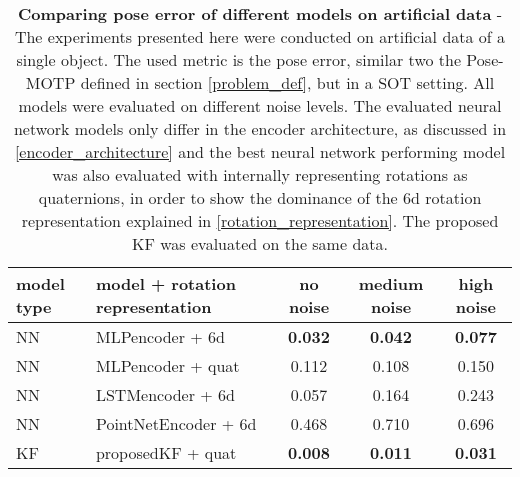 \documentclass{article}
\begin{document}
\begin{table}[h!]
	\centering
	\begin{tabular}{|l|l |c| c| c|} 
		\hline
		model type & model + rotation representation & no noise & medium noise & high noise \\ \hline
		\hline
		NN & MLPencoder + 6d & \textbf{0.032} & \textbf{0.042} & \textbf{0.077} \\ \hline
		NN & MLPencoder + quat & 0.112 & 0.108 & 0.150 \\ \hline
		NN & LSTMencoder + 6d & 0.057 & 0.164 & 0.243 \\ \hline
		NN & PointNetEncoder + 6d & 0.468 & 0.710 & 0.696 \\ \hline \hline
		KF & proposedKF + quat       & \textbf{0.008} & \textbf{0.011} & \textbf{0.031} \\
		\hline
	\end{tabular}\\
	\bigskip
	\caption{\textbf{Comparing pose error of different models on artificial data} - The experiments presented here were conducted on artificial data of a single object. The used metric is the pose error, similar two the Pose-MOTP defined in section \ref{problem_def}, but in a SOT setting. All models were evaluated on different noise levels. The evaluated neural network models only differ in the encoder architecture, as discussed in \ref{encoder_architecture} and the best neural network performing model was also evaluated with internally representing rotations as quaternions, in order to show the dominance of the 6d rotation representation explained in \ref{rotation_representation}.  The proposed KF was evaluated on the same data. }
	\label{pose_error_results}
\end{table}
\end{document}
